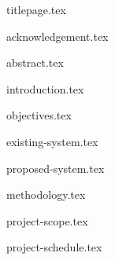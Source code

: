 \documentclass[a4paper,12pt,titlepage,oneside]{article}
\begin{document}
{titlepage.tex}

\newpage
{acknowledgement.tex}

\newpage
\tableofcontents
{}

\newpage
{abstract.tex}

{introduction.tex}

{objectives.tex}

{existing-system.tex}

{proposed-system.tex}

{methodology.tex}

{project-scope.tex}

{project-schedule.tex}
\end{document}
